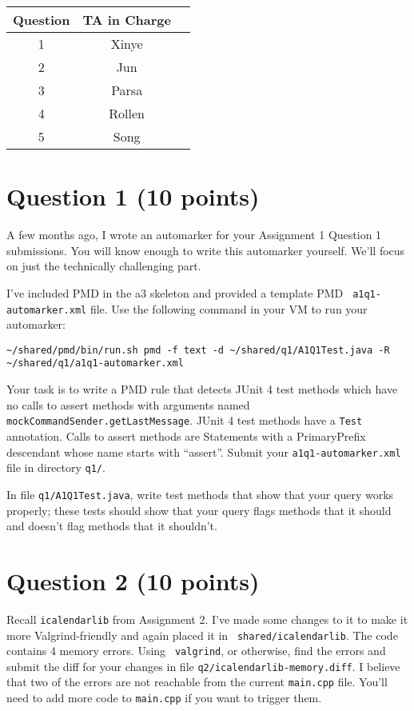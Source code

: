 \documentclass[10pt,hidelinks]{article}
\begin{document}
 \begin{center}
 \begin{tabular}{c|cc}
 Question   &  TA in Charge \\ \hline
1 & Xinye \\
2 & Jun \\
3 & Parsa \\
4 & Rollen \\
5 & Song
 \end{tabular}
 \end{center}

\newpage
\section*{Question 1 (10 points)}
A few months ago, I wrote an automarker for your Assignment 1 Question 1 submissions.
You will know enough to write this automarker yourself. We'll focus on just the
technically challenging part.

I've included PMD in the a3 skeleton and provided a template PMD {\tt
  a1q1-automarker.xml} file. Use the following command in your VM to run your automarker:

\begin{verbatim}
~/shared/pmd/bin/run.sh pmd -f text -d ~/shared/q1/A1Q1Test.java -R ~/shared/q1/a1q1-automarker.xml
\end{verbatim}

Your task is to write a PMD rule that detects JUnit 4 test methods which have no calls to assert methods with arguments named {\tt mockCommandSender.getLastMessage}. JUnit 4 test methods have a {\tt Test} annotation. Calls to assert methods are Statements with a PrimaryPrefix descendant whose name starts with ``assert''. Submit your {\tt a1q1-automarker.xml} file in directory {\tt q1/}.

In file {\tt q1/A1Q1Test.java}, write test methods that show
that your query works properly; these tests should show that your query flags methods
that it should and doesn't flag methods that it shouldn't.

\section*{Question 2 (10 points)}

Recall {\tt icalendarlib} from Assignment 2. I've made some changes to
it to make it more Valgrind-friendly and again placed it in {\tt
  shared/icalendarlib}. The code contains 4 memory errors. Using {\tt
  valgrind}, or otherwise, find the errors and submit the diff for
your changes in file {\tt q2/icalendarlib-memory.diff}. I believe that two of
the errors are not reachable from the current {\tt main.cpp}
file. You'll need to add more code to {\tt main.cpp} if you want to
trigger them.
\end{document}
